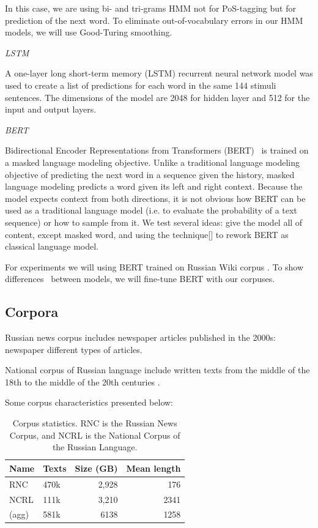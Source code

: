 \documentclass[a4paper]{article}
\newcommand{\head}[1]{\vspace{0.5em}\emph{#1}\vspace{0.25em}}
\begin{document}
In this case, we are using bi- and tri-grams HMM not for PoS-tagging but for prediction of the next word. To eliminate out-of-vocabulary errors in our HMM models, we will use Good-Turing smoothing.

\head{LSTM}

A one-layer long short-term memory (LSTM) recurrent neural network model was used
\cite{jozefowicz:2016}
to create a list of predictions for each word in the same 144 stimuli sentences. The dimensions of the model are 2048 for hidden layer and 512 for the input and output layers. 

\head{BERT}

Bidirectional Encoder Representations from Transformers
(BERT) \cite{bert} is trained on a masked language modeling objective. Unlike a traditional language modeling objective of predicting the next word in a sequence given the history, masked language modeling predicts a word given its left and right context. Because the model expects context from both directions, it is not obvious how BERT can be used as a traditional language model (i.e. to evaluate the probability of a text sequence) or how to sample from it. We test several ideas: give the model all of content, except masked word, and using the technique[] to rework BERT as classical language model.


For experiments we will using BERT trained on Russian Wiki corpus
\cite{ruwiki}. To show differences  between models, we will fine-tune BERT with our corpuses.



\subsection{Corpora}

Russian news corpus \cite{runews} includes newspaper articles published in the 2000s: newspaper different types of articles.
 

National corpus of Russian language \cite{natcorp} include written texts from the middle of the 18th to the middle of the 20th centuries
.

Some corpus characteristics presented below:

\begin{table}
\caption{Corpus statistics. RNC is the Russian News Corpus, and NCRL
is the National Corpus of the Russian Language.}
\centering

\begin{tabular}{llrr}
\textbf{Name}&
\textbf{Texts} &
\textbf{Size} (GB)&
\textbf{Mean length}\\
\hline
RNC &
470k&
2,928&
176\\
NCRL &
111k &
3,210 &
2341 \\
(agg) &
581k &
6138 &
1258
\end{tabular}
\end{table}
\end{document}
